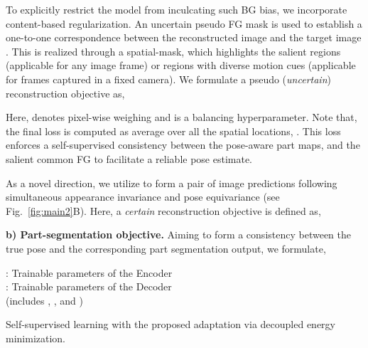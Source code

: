 To explicitly restrict the model from inculcating such BG bias, we incorporate content-based regularization. An {uncertain} pseudo FG mask is used to establish a one-to-one correspondence between the reconstructed image  and the target image . This is realized through a spatial-mask,  which highlights the salient regions (applicable for any image frame) or regions with diverse motion cues (applicable for frames captured in a fixed camera). We formulate a pseudo (\textit{uncertain}) reconstruction objective as, 

\vspace{-5mm}


Here,  denotes pixel-wise weighing and  is a balancing hyperparameter. Note that, 
the final loss is computed as average over all the spatial locations, .
This loss enforces a self-supervised consistency between the pose-aware part maps,  and the salient common FG to facilitate a reliable pose estimate.

As a novel direction, we utilize  
to form a pair of image predictions  following simultaneous appearance invariance and pose equivariance (see Fig.~\ref{fig:main2}{\color{red}B}). Here, a \textit{certain} reconstruction objective is defined as, 


\vspace{-5mm}



\vspace{1mm}\noindent
\textbf{b) Part-segmentation objective.} 
Aiming to form a consistency between the true pose  and the corresponding part segmentation output, we formulate, 

\vspace{-5mm}




\begin{algorithm}[!b]
\vspace{-2mm}
\SetAlgoLined
: Trainable parameters of the Encoder \\   
: Trainable parameters of the Decoder \\
 (includes , , and )

 \vspace{1mm}
\caption{Self-supervised learning with the proposed adaptation via decoupled energy minimization. 
\vspace{-2mm}} \label{algo:1}
\end{algorithm}



